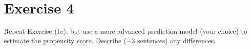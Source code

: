 
\section{Exercise 4}

\begin{quoting}
  Repeat Exercise (1e), but use a more advanced prediction model (your
  choice) to estimate the propensity score. Describe ($\sim$3
  sentences) any differences.
\end{quoting}

